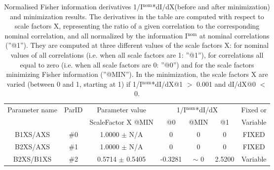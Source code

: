 \begin{table}[H]
\scriptsize
\begin{center}
\renewcommand{\arraystretch}{1.1}
\begin{tabular}{|c|c|c|ccc|c|}
\hline
Parameter name & ParID & Parameter value &\multicolumn{3}{|c|}{1/I$^\mathrm{nom}$*dI/dX} &Fixed or\\
 & & ScaleFactor X @MIN & @0 & @MIN & @1 & Variable\\
\hline
 {\tiny B1XS/AXS} & \#0 &    1.0000 $\pm$ N/A & 0 & 0 & 0 & FIXED \\
 {\tiny B2XS/AXS} & \#1 &    1.0000 $\pm$ N/A & 0 & 0 & 0 & FIXED \\
 {\tiny B2XS/B1XS} & \#2 &    0.5714 $\pm$    0.5405 &   -0.3281 & {\tiny $\sim$ }0 &    2.5200 & Variable \\
\hline
\end{tabular}
\renewcommand{\arraystretch}{1}
\caption{Normalised Fisher information derivatives 1/I$^\mathrm{nom}$*dI/dX(before and after minimization) and minimization results.  The derivatives in the table are computed with respect to scale factors X, representing the ratio of a given correlation to the corresponding nominal correlation, and all normalized by the information I$^\mathrm{nom}$ at nominal correlations (''@1''). They are computed at three different values of the scale factors X: for nominal values of all correlations (i.e. when all scale factors are 1: ''@1''), for correlations all equal to zero (i.e. when all scale factors are 0: ''@0'') and for the scale factors minimizing Fisher information (''@MIN''). In the minimization, the scale factors X are varied (between 0 and 1, starting at 1) if 1/I$^\mathrm{nom}$*dI/dX@1 $>$ 0.001 and dI/dX@0 $<$ 0.}
\end{center}
\end{table}
